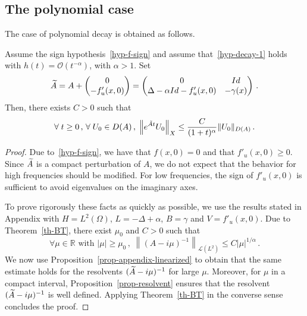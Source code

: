\documentclass[AHL,Unicode,longabstracts]{cedram}
\newcommand{\RR}{\mathbb{R}}
\newcommand{\Lc}{\mathcal{L}}
\newcommand{\Oc}{\mathcal{O}}
\let\oldtilde\tilde
\renewcommand*{\tilde}[1]{\mathchoice{\widetilde{#1}}{\widetilde{#1}}{\oldtilde{#1}}{\oldtilde{#1}}}\let\oldexists\exists
\renewcommand*{\exists}{\mathrel{\oldexists}}
\let\oldforall\forall
\renewcommand*{\forall}{\mathrel{\oldforall}}
\begin{document}
\subsection{The polynomial case}
The case of polynomial decay is obtained as follows.

\begin{lemm}\label{lemma-appli1}
Assume the sign hypothesis~\eqref{hyp-f-sign} and assume that~\eqref{hyp-decay-1} holds with $h(t)=\Oc(t^{-\alpha})$, with $\alpha>1$. Set
\[
\tilde A=A + 
\begin{pmatrix}
 0 \\
-f'_u(x,0)
\end{pmatrix}=
\begin{pmatrix}
0 & Id\\
\Delta-\alpha Id-f'_u(x,0) & -\gamma(x)
\end{pmatrix}\,.
\]
Then, there exists $C>0$ such that
\[
\forall t\geq 0\,,\,\forall U_0\in D(A)\,,\;\left\|e^{\tilde At} U_0\right\|_X \leq \frac
C{(1+t)^{\alpha}} \|U_0\|_{D(A)}\,.
\]
\end{lemm}


\begin{proof}
Due to~\eqref{hyp-f-sign}, we have that $f(x,0)=0$ and that $f'_u(x,0)\geq 0$. Since $\tilde A$ is a compact perturbation of $A$, we do not expect that the behavior for high frequencies should be modified. For low frequencies, the sign of $f'_u(x,0)$ is sufficient to avoid eigenvalues on the imaginary axes.

To prove rigorously these facts as quickly as possible, we use the results stated in Appendix with $H=L^2(\Omega)$, $L=-\Delta+\alpha$, $B=\gamma$ and $V=f'_u(x,0)$. Due to Theorem~\ref{th-BT}, there exist $\mu_0$ and $C>0$ such that
\[
\forall \mu\in\RR\text{ with }|\mu|\geq
\mu_0\,,\;\left\|(A-i\mu)^{-1}\right\|_{\Lc(L^2)}
\leq C {|\mu|^{1/\alpha}}\,.
\]
We now use Proposition~\ref{prop-appendix-linearized} to obtain that the same estimate holds for the resolvents $(\tilde A-i\mu)^{-1}$ for large $\mu$. Moreover, for $\mu$ in a compact interval, Proposition~\ref{prop-resolvent} ensures that the resolvent $(\tilde A-i\mu)^{-1}$ is well defined. Applying Theorem~\ref{th-BT} in the converse sense concludes the proof.
\end{proof}
\end{document}
